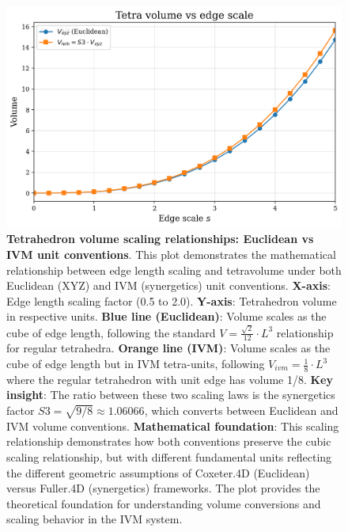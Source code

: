 \documentclass[
  10pt,
]{article}
\begin{document}
\begin{figure}
\centering
\includegraphics{../output/figures/volumes_scale_plot.png}
\caption{\textbf{Tetrahedron volume scaling relationships: Euclidean vs
IVM unit conventions}. This plot demonstrates the mathematical
relationship between edge length scaling and tetravolume under both
Euclidean (XYZ) and IVM (synergetics) unit conventions. \textbf{X-axis}:
Edge length scaling factor (0.5 to 2.0). \textbf{Y-axis}: Tetrahedron
volume in respective units. \textbf{Blue line (Euclidean)}: Volume
scales as the cube of edge length, following the standard
\(V = \frac{\sqrt{2}}{12} \cdot L^3\) relationship for regular
tetrahedra. \textbf{Orange line (IVM)}: Volume scales as the cube of
edge length but in IVM tetra-units, following
\(V_{ivm} = \frac{1}{8} \cdot L^3\) where the regular tetrahedron with
unit edge has volume 1/8. \textbf{Key insight}: The ratio between these
two scaling laws is the synergetics factor
\(S3 = \sqrt{9/8} \approx 1.06066\), which converts between Euclidean
and IVM volume conventions. \textbf{Mathematical foundation}: This
scaling relationship demonstrates how both conventions preserve the
cubic scaling relationship, but with different fundamental units
reflecting the different geometric assumptions of Coxeter.4D (Euclidean)
versus Fuller.4D (synergetics) frameworks. The plot provides the
theoretical foundation for understanding volume conversions and scaling
behavior in the IVM system.}
\end{figure}
\end{document}
